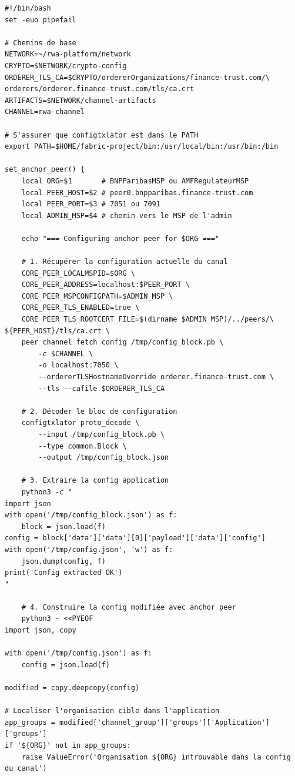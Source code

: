 \documentclass[12pt,a4paper,french]{article}
\begin{document}
\begin{lstlisting}[style=bash, caption={Script set\_anchor\_peers.sh}]
#!/bin/bash
set -euo pipefail

# Chemins de base
NETWORK=~/rwa-platform/network
CRYPTO=$NETWORK/crypto-config
ORDERER_TLS_CA=$CRYPTO/ordererOrganizations/finance-trust.com/\
orderers/orderer.finance-trust.com/tls/ca.crt
ARTIFACTS=$NETWORK/channel-artifacts
CHANNEL=rwa-channel

# S'assurer que configtxlator est dans le PATH
export PATH=$HOME/fabric-project/bin:/usr/local/bin:/usr/bin:/bin

set_anchor_peer() {
    local ORG=$1       # BNPParibasMSP ou AMFRegulateurMSP
    local PEER_HOST=$2 # peer0.bnpparibas.finance-trust.com
    local PEER_PORT=$3 # 7051 ou 7091
    local ADMIN_MSP=$4 # chemin vers le MSP de l'admin

    echo "=== Configuring anchor peer for $ORG ==="

    # 1. Récupérer la configuration actuelle du canal
    CORE_PEER_LOCALMSPID=$ORG \
    CORE_PEER_ADDRESS=localhost:$PEER_PORT \
    CORE_PEER_MSPCONFIGPATH=$ADMIN_MSP \
    CORE_PEER_TLS_ENABLED=true \
    CORE_PEER_TLS_ROOTCERT_FILE=$(dirname $ADMIN_MSP)/../peers/\
${PEER_HOST}/tls/ca.crt \
    peer channel fetch config /tmp/config_block.pb \
        -c $CHANNEL \
        -o localhost:7050 \
        --ordererTLSHostnameOverride orderer.finance-trust.com \
        --tls --cafile $ORDERER_TLS_CA

    # 2. Décoder le bloc de configuration
    configtxlator proto_decode \
        --input /tmp/config_block.pb \
        --type common.Block \
        --output /tmp/config_block.json

    # 3. Extraire la config application
    python3 -c "
import json
with open('/tmp/config_block.json') as f:
    block = json.load(f)
config = block['data']['data'][0]['payload']['data']['config']
with open('/tmp/config.json', 'w') as f:
    json.dump(config, f)
print('Config extracted OK')
"

    # 4. Construire la config modifiée avec anchor peer
    python3 - <<PYEOF
import json, copy

with open('/tmp/config.json') as f:
    config = json.load(f)

modified = copy.deepcopy(config)

# Localiser l'organisation cible dans l'application
app_groups = modified['channel_group']['groups']['Application']['groups']
if '${ORG}' not in app_groups:
    raise ValueError('Organisation ${ORG} introuvable dans la config du canal')


\end{lstlisting}
\end{document}
